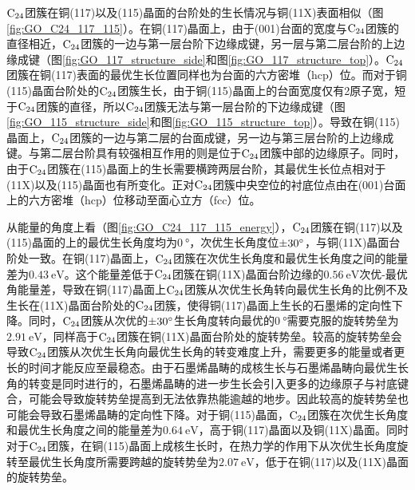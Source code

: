 $\rm{C_{24}}$团簇在铜(117)以及(115)晶面的台阶处的生长情况与铜(11X)表面相似（图\ref{fig:GO_C24_117_115}）。在铜(117)晶面上，由于(001)台面的宽度与$\rm{C_{24}}$团簇的直径相近，$\rm{C_{24}}$团簇的一边与第一层台阶下边缘成键，另一层与第二层台阶的上边缘成键（图\ref{fig:GO_117_structure_side}和图\ref{fig:GO_117_structure_top}）。$\rm{C_{24}}$团簇在铜(117)表面的最优生长位置同样也为台面的六方密堆（hcp）位。而对于铜(115)晶面台阶处的$\rm{C_{24}}$团簇生长，由于铜(115)晶面上的台面宽度仅有2原子宽，短于$\rm{C_{24}}$团簇的直径，所以$\rm{C_{24}}$团簇无法与第一层台阶的下边缘成键（图\ref{fig:GO_115_structure_side}和图\ref{fig:GO_115_structure_top}）。导致在铜(115)晶面上，$\rm{C_{24}}$团簇的一边与第二层的台面成键，另一边与第三层台阶的上边缘成键。与第二层台阶具有较强相互作用的则是位于$\rm{C_{24}}$团簇中部的边缘原子。同时，由于$\rm{C_{24}}$团簇在(115)晶面上的生长需要横跨两层台阶，其最优生长位点相对于(11X)以及(115)晶面也有所变化。正对$\rm{C_{24}}$团簇中央空位的衬底位点由在(001)台面上的六方密堆（hcp）位移动至面心立方（fcc）位。

从能量的角度上看（图\ref{fig:GO_C24_117_115_energy}），$\rm{C_{24}}$团簇在铜(117)以及(115)晶面的上的最优生长角度均为$\SI{0 }{\degree}$，次优生长角度位$\SI{\pm 30 }{\degree}$，与铜(11X)晶面台阶处一致。在铜(117)晶面上，$\rm{C_{24}}$团簇在次优生长角度和最优生长角度之间的能量差为$\SI{0.43}{\electronvolt}$。这个能量差低于$\rm{C_{24}}$团簇在铜(11X)晶面台阶边缘的$\SI{0.56}{\electronvolt}$次优-最优角能量差，导致在铜(117)晶面上$\rm{C_{24}}$团簇从次优生长角转向最优生长角的比例不及生长在(11X)晶面台阶处的$\rm{C_{24}}$团簇，使得铜(117)晶面上生长的石墨烯的定向性下降。同时，$\rm{C_{24}}$团簇从次优的$\SI{\pm 30 }{\degree}$生长角度转向最优的$\SI{0}{\degree}$需要克服的旋转势垒为$\SI{2.91 }{\electronvolt}$，同样高于$\rm{C_{24}}$团簇在铜(11X)晶面台阶处的旋转势垒。较高的旋转势垒会导致$\rm{C_{24}}$团簇从次优生长角向最优生长角的转变难度上升，需要更多的能量或者更长的时间才能反应至最稳态。由于石墨烯晶畴的成核生长与石墨烯晶畴向最优生长角的转变是同时进行的，石墨烯晶畴的进一步生长会引入更多的边缘原子与衬底键合，可能会导致旋转势垒提高到无法依靠热能逾越的地步。因此较高的旋转势垒也可能会导致石墨烯晶畴的定向性下降。对于铜(115)晶面，$\rm{C_{24}}$团簇在次优生长角度和最优生长角度之间的能量差为$\SI{0.64}{\electronvolt}$，高于铜(117)晶面以及铜(11X)晶面。同时对于$\rm{C_{24}}$团簇，在铜(115)晶面上成核生长时，在热力学的作用下从次优生长角度旋转至最优生长角度所需要跨越的旋转势垒为$\SI{2.07 }{\electronvolt}$，低于在铜(117)以及(11X)晶面的旋转势垒。

